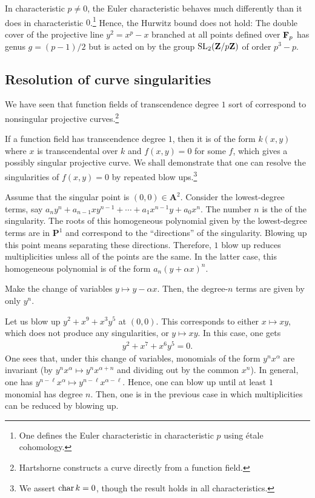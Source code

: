 \documentclass [11 pt, oneside, margin = 1 in] {article}
\begin{document}
\begin{remark}
	In characteristic $p\ne 0$, the Euler characteristic behaves much differently than it does in characteristic $0$.\footnote{One defines the Euler characteristic in characteristic $p$ using \'etale cohomology.} Hence, the Hurwitz bound does not hold: The double cover of the projective line $y^2=x^p-x$ branched at all points defined over $\mathbf F_p$ has genus $g = (p-1)/2$ but is acted on by the group $\operatorname{SL}_{2}(\mathbf Z/p\mathbf Z)$ of order $p^3-p$.
\end{remark}

\subsection{Resolution of curve singularities}
We have seen that function fields of transcendence degree $1$ sort of correspond to nonsingular projective curves.\footnote{Hartshorne constructs a curve directly from a function field.} 

If a function field has transcendence degree $1$, then it is of the form $k(x,y)$ where $x$ is transcendental over $k$ and $f(x,y)=0$ for some $f$, which gives a possibly singular projective curve. We shall demonstrate that one can resolve the singularities of $f(x,y)=0$ by repeated blow ups.\footnote{We assert $\operatorname{char} k =0$, though the result holds in all characteristics.}

Assume that the singular point is $(0,0)\in  \mathbf{A}^2$. Consider the lowest-degree terms, say $a_ny^n + a_{n-1}xy^{n-1} + \cdots + a_1 x^{n-1}y + a_0 x^n$. The number $n$ is the  of the singularity. The roots of this homogeneous polynomial given by the lowest-degree terms are in $\mathbf{P}^1$ and correspond to the ``directions'' of the singularity. Blowing up this point means separating these directions. Therefore, $1$ blow up reduces multiplicities unless all of the points are the same. In the latter case, this homogeneous polynomial is of the form $a_n(y+\alpha x)^n$.

Make the change of variables $y\longmapsto y-\alpha x$. Then, the degree-$n$ terms are given by only $y^n$.

\begin{example}[ ]\label{}\text{}
Let us blow up $y^2+x^9 + x^3y^5$ at $(0,0)$. This corresponds to either $x\longmapsto xy$, which does not produce any singularities, or $y\longmapsto xy$. In this case, one gets
\begin{align*}
	y^2 + x^7 + x^6y^5=0.
\end{align*}
One sees that, under this change of variables, monomials of the form $y^nx^\alpha$ are invariant (by $y^nx^\alpha\longmapsto y^nx^{\alpha+n}$ and dividing out by the common $x^n$). In general, one has $y^{n-\ell}x^\alpha \longmapsto y^{n-\ell}x^{\alpha-\ell}$. Hence, one can blow up until at least $1$ monomial has degree $n$. Then, one is in the previous case in which multiplicities can be reduced by blowing up.
\end{example}
\end{document}
